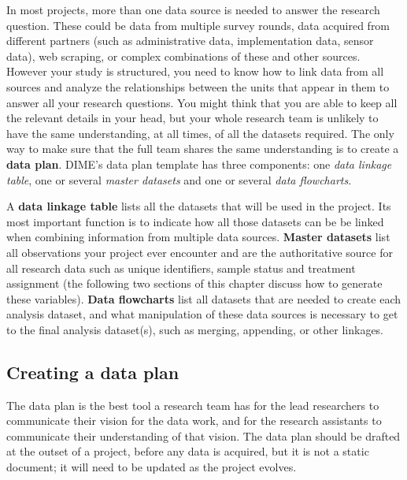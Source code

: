 In most projects, more than one data source is needed to answer the research question.
These could be data from multiple survey rounds,
data acquired from different partners (such as administrative data, implementation data, sensor data),
web scraping,
or complex combinations of these and other sources.
However your study is structured, you need to know how to link data from all sources
and analyze the relationships between the units that appear in them
to answer all your research questions.
You might think that you are able to keep all the relevant details in your head,
but your whole research team is unlikely to have the same understanding,
at all times, of all the datasets required.
The only way to make sure that the full team shares the same understanding
is to create a \textbf{data plan}.
DIME's data plan template has three components:
one \textit{data linkage table},
one or several \textit{master datasets}
and one or several \textit{data flowcharts}.

A \textbf{data linkage table}
lists all the datasets that will be used in the project.
Its most important function is to indicate
how all those datasets can be be linked when
combining information from multiple data sources.
\textbf{Master datasets}
list all observations your project ever encounter
and are the authoritative source for all research data
such as unique identifiers, sample status and treatment assignment
(the following two sections of this chapter discuss how to generate these variables).
\textbf{Data flowcharts}
list all datasets that are needed to create each analysis dataset,
and what manipulation of these data sources is necessary
to get to the final analysis dataset(s),
such as merging, appending, or other linkages.

\subsection{Creating a data plan}

The data plan is the best tool a research team has for
the lead researchers to communicate their vision for the data work,
and for the research assistants to communicate their understanding of that vision.
The data plan should be drafted at the outset of a project,
before any data is acquired,
but it is not a static document;
it will need to be updated as the project evolves.


